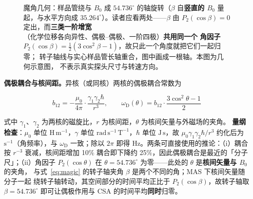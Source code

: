 \begin{figure}[htbp]
\centering
\caption{魔角几何：样品管绕与 $B_0$ 成 $54.736^\circ$ 的轴旋转（$\beta$ 自\textbf{竖直的
$B_0$} 量起，与水平方向成 $35.264^\circ$）。读者应看两处——$\beta$ 由 $P_2(\cos\beta)=0$
定出，而\textbf{三类一阶增宽}（化学位移各向异性、偶极--偶极、一阶四极）\textbf{共用同一个
角因子} $P_2(\cos\beta)=\tfrac{1}{2}(3\cos^{2}\beta-1)$，故只此一个角度就把它们一起归零；
转子轴线与实心样品管长轴重合，图中画成一根轴。本图为几何示意图，
不表示真实探头尺寸与转速方向。\schemamark{}}
\label{fig:magic-angle}
\end{figure}

\textbf{偶极耦合与核间距。}异核（或同核）两核的偶极耦合常数为

\begin{equation}
\label{eq:dipolar}
b_{12}=-\frac{\mu_0}{4\pi}\cdot\frac{\gamma_1\gamma_2\hbar}{r^{3}},
\qquad
\omega_{\mathrm{D}}(\theta)=b_{12}\cdot\frac{3\cos^{2}\theta-1}{2}
\end{equation}

式中 $\gamma_1$、$\gamma_2$ 为两核的磁旋比，$r$ 为核间距，$\theta$ 为核间矢量与外磁场的夹角。
\textbf{量纲检查}：$\mu_0$ 单位 $\mathrm{H\,m^{-1}}$，$\gamma$ 单位
$\mathrm{rad\,s^{-1}\,T^{-1}}$，$\hbar$ 单位 $\mathrm{J\,s}$，故
$\mu_0\gamma_1\gamma_2\hbar/r^{3}$ 约化后为 $\mathrm{s^{-1}}$（角频率），与 $\omega_{\mathrm{D}}$
一致；除以 $2\pi$ 即得 Hz。两条可直接使用的推论：（i）耦合按 $r^{-3}$ 衰减，核间距增加
10\% 耦合即下降约 25\%，因此偶极耦合是最近的「分子尺」；（ii）角因子 $P_2(\cos\theta)$
在 $\theta=54.736^\circ$ 为零——此处的 $\theta$ 是\textbf{核间矢量与 $B_0$} 的夹角，
与式~\eqref{eq:magic} 的转子轴夹角 $\beta$ 是两个不同的角；MAS 下核间矢量随分子一起
绕转子轴转动，其空间部分的时间平均正比于 $P_2(\cos\beta)$，故转子轴取 $\beta=54.736^\circ$
即可让偶极作用与 CSA 的时间平均\textbf{同时}归零。

